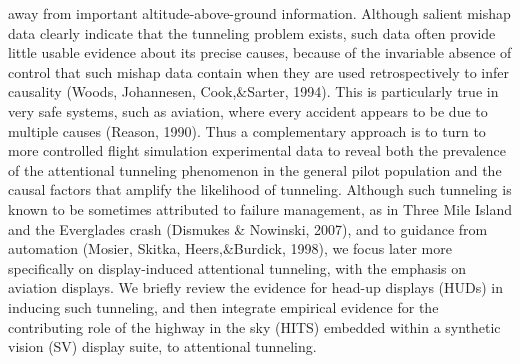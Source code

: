 \documentclass[utf8,bachelor,manualbib]{gradu3}
\begin{document}
away from important altitude-above-ground information.
Although salient mishap data clearly indicate that the tunneling problem exists,
such data often provide little usable evidence about its precise causes, because of
the invariable absence of control that such mishap data contain when they are used
retrospectively to infer causality (Woods, Johannesen, Cook,\&Sarter, 1994). This
is particularly true in very safe systems, such as aviation, where every accident appears
to be due to multiple causes (Reason, 1990). Thus a complementary approach
is to turn to more controlled flight simulation experimental data to reveal
both the prevalence of the attentional tunneling phenomenon in the general pilot
population and the causal factors that amplify the likelihood of tunneling. Although
such tunneling is known to be sometimes attributed to failure management,
as in Three Mile Island and the Everglades crash (Dismukes \& Nowinski, 2007),
and to guidance from automation (Mosier, Skitka, Heers,\&Burdick, 1998), we focus
later more specifically on display-induced attentional tunneling, with the emphasis
on aviation displays. We briefly review the evidence for head-up displays
(HUDs) in inducing such tunneling, and then integrate empirical evidence for the
contributing role of the highway in the sky (HITS) embedded within a synthetic vision
(SV) display suite, to attentional tunneling.
\end{document}
